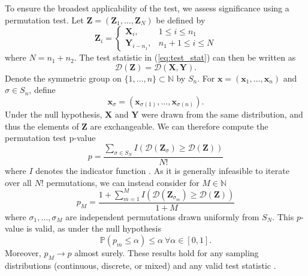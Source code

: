 To ensure the broadest applicability of the test, we assess significance using a permutation test. Let $\mathbf{Z}=(\mathbf{Z}_{1},\dots,\mathbf{Z}_{N})$ be defined by
\begin{equation*}
\mathbf{Z}_{i}=\begin{cases}
\mathbf{X}_{i},&1\leq i\leq n_{1}\\
\mathbf{Y}_{i-n_{1}},&n_{1}+1\leq i\leq N
\end{cases}
\end{equation*}
where $N=n_{1}+n_{2}$. The test statistic in (\ref{eq:test_stat}) can then be written as
\begin{equation*}
\mathcal{D}(\mathbf{Z})=\mathcal{D}(\mathbf{X},\mathbf{Y}).
\end{equation*}
Denote the symmetric group on $\{1,\dots,n\}\subset\mathbb{N}$ by $S_{n}$. For $\mathbf{x}=(\mathbf{x}_{1},\dots,\mathbf{x}_{n})$ and $\sigma\in S_{n}$, define
\begin{equation*}
\mathbf{x}_{\sigma}=(\mathbf{x}_{\sigma(1)},\dots,\mathbf{x}_{\sigma(n)}).
\end{equation*}
Under the null hypothesis, $\mathbf{X}$ and $\mathbf{Y}$ were drawn from the same distribution, and thus the elements of $\mathbf{Z}$ are exchangeable. We can therefore compute the permutation test p-value
\begin{equation}
p=\frac{\sum_{\sigma\in S_{N}}I(\mathcal{D}(\mathbf{Z}_{\sigma})\geq\mathcal{D}(\mathbf{Z}))}{N!}
\end{equation}
where $I$ denotes the indicator function \citep{hemerik2018,ramdas2022permutation}. As it is generally infeasible to iterate over all $N!$ permutations, we can instead consider for $M\in\mathbb{N}$
\begin{equation}
p_{M}=\frac{1+\sum_{m=1}^{M}I(\mathcal{D}(\mathbf{Z}_{\sigma_{m}})\geq\mathcal{D}(\mathbf{Z}))}{1+M}
\end{equation}
where $\sigma_{1},\dots,\sigma_{M}$ are independent permutations drawn uniformly from $S_{N}$. This $p$-value is valid, as under the null hypothesis
\begin{equation*}
\mathbb{P}(p_{m}\leq\alpha)\leq\alpha \ \forall\alpha\in[0,1].
\end{equation*}
Moreover, $p_{M}\to p$ almost surely. These results hold for any sampling distributions (continuous, discrete, or mixed) and any valid test statistic \citep{hemerik2018, ramdas2022permutation}.

